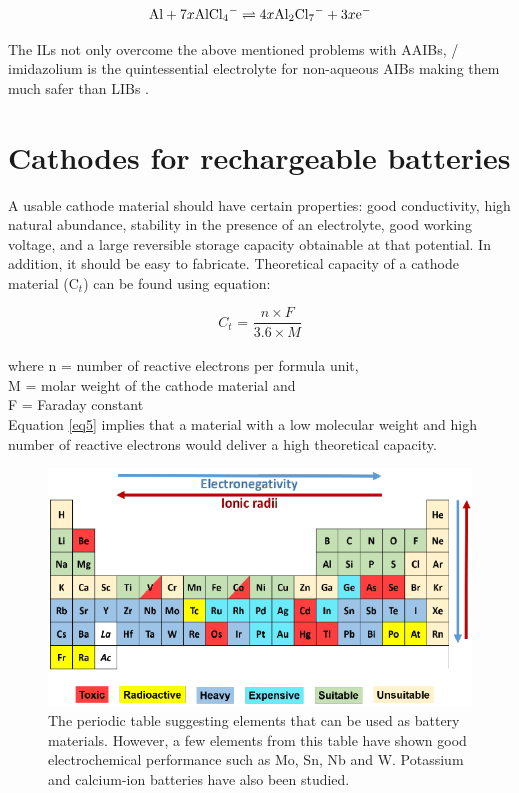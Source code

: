 \begin{align*}
        \ce{Al} + 7x\ce{AlCl4-} \rightleftharpoons 4x\ce{Al2Cl7-} + 3x\ce{e-}
\end{align*}

The ILs not only overcome the above mentioned problems with AAIBs, / imidazolium is the quintessential electrolyte for non-aqueous AIBs making them much safer than LIBs \cite{jayaprakash_rechargeable_2011, lin_ultrafast_2015-3,wang_new_2013-1,rani_fluorinated_2013}. 

\section{Cathodes for rechargeable batteries}
A usable cathode material should have certain properties: good conductivity, high natural abundance, stability in the presence of an electrolyte, good working voltage, and a large reversible storage capacity obtainable at that potential. In addition, it should be easy to fabricate. Theoretical capacity of a cathode material (C$_{t}$) can be found using equation:

\begin{equation} \label{eq5}
   C_{t} \text{ = } \frac{n \times F}{3.6 \times M}
\end{equation}\\
where n = number of reactive electrons per formula unit,\\
M = molar weight of the cathode material and\\
F = Faraday constant\\
Equation \ref{eq5} implies that a material with a low molecular weight and high number of reactive electrons would deliver a high theoretical capacity.

\begin{figure}[h!]
\centering
\includegraphics[width=\textwidth]{Figures/chap1fig/pertab.pdf}
\caption{The periodic table suggesting elements that can be used as battery materials. However, a few elements from this table have shown good electrochemical performance such as Mo, Sn, Nb and W. Potassium and calcium-ion batteries have also been studied.}
\label{Figures/chap1fig:pertab}
\end{figure}

